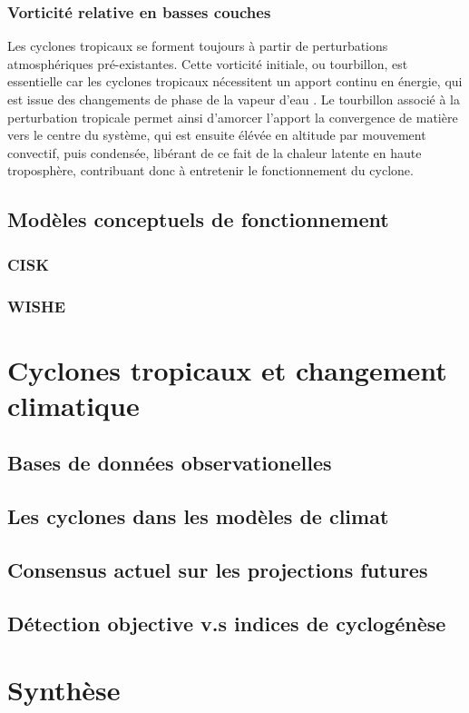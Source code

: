 \documentclass[../main.tex]{subfiles}
\begin{document}
\subsubsection{Vorticité relative en basses couches}

Les cyclones tropicaux se forment toujours à partir de perturbations atmosphériques pré-existantes. Cette vorticité initiale, ou tourbillon, est essentielle car les cyclones tropicaux nécessitent un apport continu en énergie, qui est issue des changements de phase de la vapeur d'eau \parencite{roux_cyclones_1997}. Le tourbillon associé à la perturbation tropicale permet ainsi d'amorcer l'apport la convergence de matière vers le centre du système, qui est ensuite élévée en altitude par
mouvement convectif, puis condensée, libérant de ce fait de la chaleur latente en haute troposphère, contribuant donc à entretenir le fonctionnement du cyclone.

\subsection{Modèles conceptuels de fonctionnement}

\subsubsection{CISK}

\cite{charney_growth_1964,ooyama_dynamical_1964,ooyama_numerical_1969}

\subsubsection{WISHE}

\cite{emanuel_airsea_1986,emanuel_largescale_1994}

\section{Cyclones tropicaux et changement climatique}

\subsection{Bases de données observationelles}

\subsection{Les cyclones dans les modèles de climat}

\subsection{Consensus actuel sur les projections futures}\label{sec:projections_futures}

\cite{seneviratne_weather_2021}

\subsection{Détection objective v.s indices de cyclogénèse}

\section{Synthèse}
\end{document}
